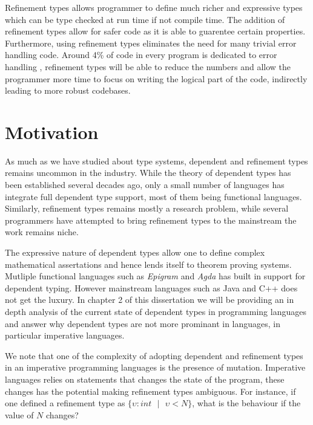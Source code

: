\documentclass[a4paper,12pt]{report}
\begin{document}
\par
Refinement types allows programmer to define much richer and expressive types 
which can be type checked at run time if not compile time. The addition 
of refinement types allow for safer code as it is able to guarentee certain 
properties. Furthermore, using refinement types eliminates the need for many 
trivial error handling code. Around 4\% of code in every program is 
dedicated to error handling \cite{errorHandlingCode}, refinement types will be 
able to reduce the numbers and allow the programmer more time to 
focus on writing the logical part of the code, indirectly 
leading to more robust codebases.

\section{Motivation}
As much as we have studied about type systems, dependent and refinement types 
remains uncommon in the industry. While the theory of dependent types has been 
established several decades ago, only a small number of languages has 
integrate full dependent type support, most of them being functional languages. 
Similarly, refinement types remains mostly a research problem, while several 
programmers have attempted to bring refinement types to the mainstream the  
work remains niche. 

\par
The expressive nature of dependent types allow one to 
define complex mathematical assertations and hence lends itself to 
theorem proving systems. Mutliple functional languages such as \textit{Epigram} 
\cite{epigram} and \textit{Agda} \cite{agda} has 
built in support for dependent typing. However 
mainstream languages such as Java and C++ does not get the luxury. In chapter 2 of 
this dissertation we will be providing an in depth analysis of the current state 
of dependent types in programming languages and answer why dependent types are 
not more prominant in languages, in particular imperative languages.

\par
We note that one of the complexity of adopting dependent and refinement types 
in an imperative programming languages is the presence of mutation. Imperative 
languages relies on statements that changes the state of the program, these 
changes has the potential making refinement types ambiguous. For instance, if 
one defined a refinement type as $\{\upsilon : int\text{ }|\text{ }\upsilon < N\}$, 
what is the behaviour if the value of $N$ changes?
\end{document}
